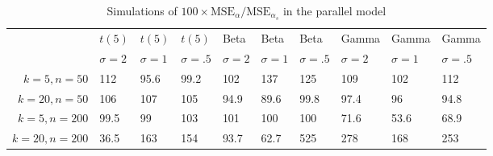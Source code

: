 \begin{table}[ht]
\centering
\caption{Simulations of $100 \times \textrm{MSE}_\alpha/\textrm{MSE}_{\alpha_s}$ in the parallel model} 
\label{tab:simulation}
\begin{tabular}{rlllllllll}
    \toprule
  & $t(5)$ & $t(5)$ & $t(5)$ & Beta & Beta & Beta & Gamma & Gamma & Gamma \\
  \cmidrule(lr){2-4}\cmidrule(lr){5-7}\cmidrule(lr){8-10} 
  & $\sigma = 2$ & $\sigma = 1$ & $\sigma = .5$ & $\sigma = 2$ & $\sigma = 1$ & $\sigma = .5$ & $\sigma = 2$ & $\sigma = 1$ & $\sigma = .5$ \\
$k = 5, n = 50$ & 112 & 95.6 & 99.2 & 102 & 137 & 125 & 109 & 102 & 112 \\ 
  $k = 20, n = 50$ & 106 & 107 & 105 & 94.9 & 89.6 & 99.8 & 97.4 & 96 & 94.8 \\ 
  $k = 5, n = 200$ & 99.5 & 99 & 103 & 101 & 100 & 100 & 71.6 & 53.6 & 68.9 \\ 
  $k = 20, n = 200$ & 36.5 & 163 & 154 & 93.7 & 62.7 & 525 & 278 & 168 & 253 \\ 
    \bottomrule
\end{tabular}
\end{table}
